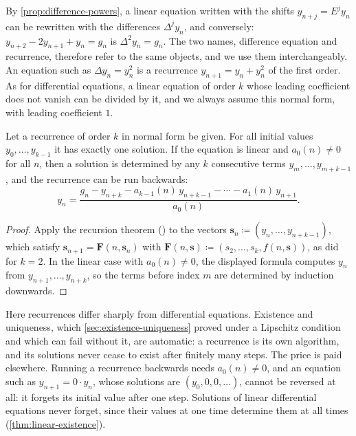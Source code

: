 By \cref{prop:difference-powers}, a linear equation written with the shifts $y_{n+j}=E^jy_n$ can be rewritten with the differences $\Delta^jy_n$, and conversely: $y_{n+2}-2y_{n+1}+y_n=g_n$ is $\Delta^2y_n=g_n$. The two names, difference equation and recurrence, therefore refer to the same objects, and we use them interchangeably. An equation such as $\Delta y_n=y_n^2$ is a recurrence $y_{n+1}=y_n+y_n^2$ of the first order. As for differential equations, a linear equation of order $k$ whose leading coefficient does not vanish can be divided by it, and we always assume this normal form, with leading coefficient $1$.

\begin{proposition}
\label{prop:recurrence-ivp}
Let a recurrence of order $k$ in normal form be given. For all initial values $y_0,\ldots,y_{k-1}$ it has exactly one solution. If the equation is linear and $a_0(n)\ne0$ for all $n$, then a solution is determined by any $k$ consecutive terms $y_m,\ldots,y_{m+k-1}$, and the recurrence can be run backwards:
\[
y_n=\frac{g_n-y_{n+k}-a_{k-1}(n)\,y_{n+k-1}-\cdots-a_1(n)\,y_{n+1}}{a_0(n)} .
\]
\end{proposition}

\begin{proof}
Apply the recursion theorem () to the vectors $\mathbf s_n\coloneqq(y_n,\ldots,y_{n+k-1})$, which satisfy $\mathbf s_{n+1}=\mathbf F(n,\mathbf s_n)$ with $\mathbf F(n,\mathbf s)\coloneqq(s_2,\ldots,s_k,f(n,\mathbf s))$, as  did for $k=2$. In the linear case with $a_0(n)\ne0$, the displayed formula computes $y_n$ from $y_{n+1},\ldots,y_{n+k}$, so the terms before index $m$ are determined by induction downwards.
\end{proof}

Here recurrences differ sharply from differential equations. Existence and uniqueness, which \cref{sec:existence-uniqueness} proved under a Lipschitz condition and which can fail without it, are automatic: a recurrence is its own algorithm, and its solutions never cease to exist after finitely many steps. The price is paid elsewhere. Running a recurrence backwards needs $a_0(n)\ne0$, and an equation such as $y_{n+1}=0\cdot y_n$, whose solutions are $(y_0,0,0,\ldots)$, cannot be reversed at all: it forgets its initial value after one step. Solutions of linear differential equations never forget, since their values at one time determine them at all times (\cref{thm:linear-existence}).

